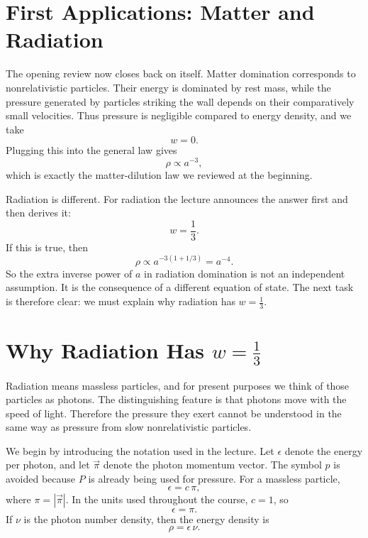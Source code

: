 \section{First Applications: Matter and Radiation}

The opening review now closes back on itself. Matter domination corresponds to nonrelativistic particles. Their energy is dominated by rest mass, while the pressure generated by particles striking the wall depends on their comparatively small velocities. Thus pressure is negligible compared to energy density, and we take
\begin{equation}
w=0.
\end{equation}
Plugging this into the general law gives
\begin{equation}
\rho\propto a^{-3},
\end{equation}
which is exactly the matter-dilution law we reviewed at the beginning.

Radiation is different. For radiation the lecture announces the answer first and then derives it:
\begin{equation}
w=\frac13.
\end{equation}
If this is true, then
\begin{equation}
\rho\propto a^{-3(1+1/3)}=a^{-4}.
\end{equation}
So the extra inverse power of \(a\) in radiation domination is not an independent assumption. It is the consequence of a different equation of state. The next task is therefore clear: we must explain why radiation has \(w=\tfrac13\).

\section{Why Radiation Has \(w=\frac13\)}

Radiation means massless particles, and for present purposes we think of those particles as photons. The distinguishing feature is that photons move with the speed of light. Therefore the pressure they exert cannot be understood in the same way as pressure from slow nonrelativistic particles.

We begin by introducing the notation used in the lecture. Let \(\epsilon\) denote the energy per photon, and let \(\vec{\pi}\) denote the photon momentum vector. The symbol \(p\) is avoided because \(P\) is already being used for pressure. For a massless particle,
\begin{equation}
\epsilon = c\,\pi,
\end{equation}
where \(\pi=|\vec{\pi}|\). In the units used throughout the course, \(c=1\), so
\begin{equation}
\epsilon=\pi.
\end{equation}
If \(\nu\) is the photon number density, then the energy density is
\begin{equation}
\rho=\epsilon\,\nu.
\end{equation}

